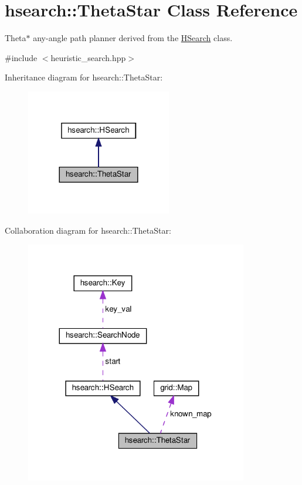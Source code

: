 \hypertarget{classhsearch_1_1ThetaStar}{}\section{hsearch\+:\+:Theta\+Star Class Reference}
\label{classhsearch_1_1ThetaStar}


Theta$\ast$ any-\/angle path planner derived from the \hyperlink{classhsearch_1_1HSearch}{H\+Search} class.  




{\ttfamily \#include $<$heuristic\+\_\+search.\+hpp$>$}



Inheritance diagram for hsearch\+:\+:Theta\+Star\+:\nopagebreak
\begin{figure}[H]
\begin{center}
\leavevmode
\includegraphics[width=180pt]{d9/db2/classhsearch_1_1ThetaStar__inherit__graph}
\end{center}
\end{figure}


Collaboration diagram for hsearch\+:\+:Theta\+Star\+:\nopagebreak
\begin{figure}[H]
\begin{center}
\leavevmode
\includegraphics[width=275pt]{da/d4f/classhsearch_1_1ThetaStar__coll__graph}
\end{center}
\end{figure}
